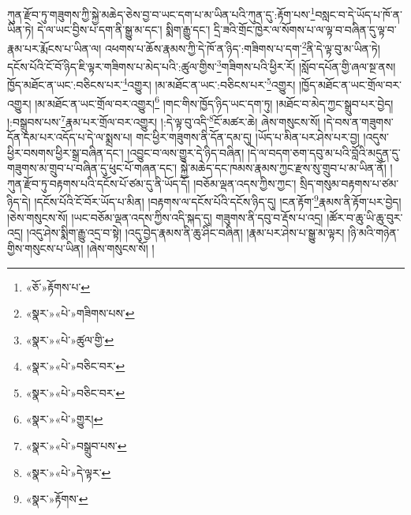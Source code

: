ཀུན་རྫོབ་ཏུ་གཟུགས་ཀྱི་སྐྱེ་མཆེད་ཅེས་བྱ་བ་ཡང་དག་པ་མ་ཡིན་པའི་ཀུན་དུ་:རྟོག་པས་\footnote{«ཅོ་»རྟོགས་པ་}བསླང་བ་དེ་ཡོད་པ་ཁོ་ན་ཡིན་ཏེ། དེ་ལ་ཡང་བྱིས་པ་དག་ནི་སྒྱུ་མ་དང་། སྨིག་རྒྱུ་དང་། དྲི་ཟའི་གྲོང་ཁྱེར་ལ་སོགས་པ་ལ་ལྟ་བ་བཞིན་དུ་ལྟ་བ་རྣམ་པར་རྨོངས་པ་ཡིན་ལ། འཕགས་པ་ཆོས་རྣམས་ཀྱི་དེ་ཁོ་ན་ཉིད་:གཟིགས་པ་དག་\footnote{«སྣར་»«པེ་»གཟིགས་པས་}ནི་དེ་ལྟ་བུ་མ་ཡིན་ཏེ། དངོས་པོའི་ངོ་བོ་ཉིད་ཇི་ལྟར་གཟིགས་པ་མེད་པའི་:ཚུལ་གྱིས་\footnote{«སྣར་»«པེ་»ཚུལ་གྱི་}གཟིགས་པའི་ཕྱིར་རོ། །སློབ་དཔོན་གྱི་ཞལ་སྔ་ནས། ཁྱོད་མཐོང་ན་ཡང་:བཅིངས་པར་\footnote{«སྣར་»«པེ་»བཅིང་བར་}འགྱུར། །མ་མཐོང་ན་ཡང་:བཅིངས་པར་\footnote{«སྣར་»«པེ་»བཅིང་བར་}འགྱུར། །ཁྱོད་མཐོང་ན་ཡང་གྲོལ་བར་འགྱུར། །མ་མཐོང་ན་ཡང་གྲོལ་བར་འགྱུར།\footnote{«སྣར་»«པེ་»གྱུར།} །གང་གིས་ཁྱོད་ཉིད་ཡང་དག་ཏུ། །མཐོང་བ་མེད་ཀྱང་སྒྲུབ་པར་བྱེད། །:བསྒྲུབས་པས་\footnote{«སྣར་»«པེ་»བསྒྲུབ་པས་}རྣམ་པར་གྲོལ་བར་འགྱུར། །:དེ་ལྟ་བུ་འདི་\footnote{«སྣར་»«པེ་»དེ་ལྟར་}ངོ་མཚར་ཆེ། ཞེས་གསུངས་སོ། །དེ་བས་ན་གཟུགས་དོན་དམ་པར་འདོད་པ་དེ་ལ་སྨྲས་པ། གང་ཕྱིར་གཟུགས་ནི་དོན་དམ་དུ། །ཡོད་པ་མིན་པར་ཤེས་པར་བྱ། །འདུས་ཕྱིར་བསགས་ཕྱིར་སྒྲ་བཞིན་དང་། །འབྱུང་བ་ལས་གྱུར་དེ་ཉིད་བཞིན། །དེ་ལ་བདག་ཅག་དབུ་མ་པའི་བློའི་མདུན་དུ་གཟུགས་མ་གྲུབ་པ་བཞིན་དུ་ཕུང་པོ་གཞན་དང་། སྐྱེ་མཆེད་དང་ཁམས་རྣམས་ཀྱང་རྫས་སུ་གྲུབ་པ་མ་ཡིན་ནོ། །ཀུན་རྫོབ་ཏུ་བརྟགས་པའི་དངོས་པོ་ཙམ་དུ་ནི་ཡོད་དོ། །བཅོམ་ལྡན་འདས་ཀྱིས་ཀྱང་། སྲིད་གསུམ་བརྟགས་པ་ཙམ་ཉིད་དེ། །དངོས་པོའི་ངོ་བོར་ཡོད་པ་མིན། །བརྟགས་ལ་དངོས་པོའི་དངོས་ཉིད་དུ། །ངན་རྟོག་\footnote{«སྣར་»རྟོགས་}རྣམས་ནི་རྟོག་པར་བྱེད། །ཅེས་གསུངས་སོ། །ཡང་བཅོམ་ལྡན་འདས་ཀྱིས་འདི་སྐད་དུ། གཟུགས་ནི་དབུ་བ་རྡོས་པ་འདྲ། །ཚོར་བ་ཆུ་ཡི་ཆུ་བུར་འདྲ། །འདུ་ཤེས་སྨིག་རྒྱུ་འདྲ་བ་སྟེ། །འདུ་བྱེད་རྣམས་ནི་ཆུ་ཤིང་བཞིན། །རྣམ་པར་ཤེས་པ་སྒྱུ་མ་ལྟར། །ཉི་མའི་གཉེན་གྱིས་གསུངས་པ་ཡིན། །ཞེས་གསུངས་སོ། །
